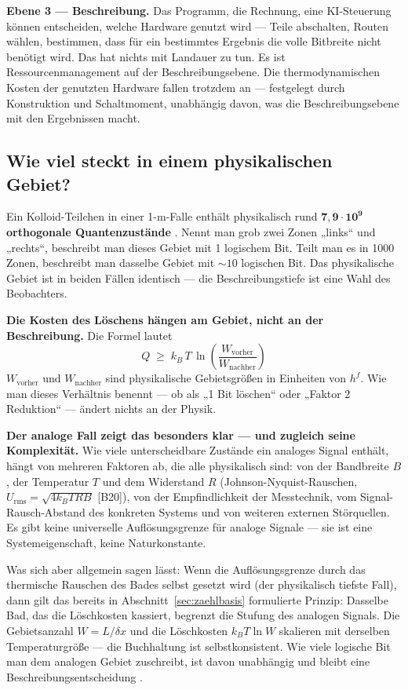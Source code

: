 \LB \textbf{Ebene 3 --- Beschreibung.} Das Programm, die Rechnung, eine
KI-Steuerung können entscheiden, welche Hardware genutzt wird --- Teile
abschalten, Routen wählen, bestimmen, dass für ein bestimmtes Ergebnis die volle
Bitbreite nicht benötigt wird. Das hat nichts mit Landauer zu tun. Es ist
Ressourcenmanagement auf der Beschreibungsebene. Die thermodynamischen Kosten der
genutzten Hardware fallen trotzdem an --- festgelegt durch Konstruktion und
Schaltmoment, unabhängig davon, was die Beschreibungsebene mit den Ergebnissen
macht.

\subsection{Wie viel steckt in einem physikalischen Gebiet?}

\LK Ein Kolloid-Teilchen in einer 1-\textmu m-Falle enthält physikalisch rund
$\mathbf{7{,}9\cdot10^{9}}$ \textbf{orthogonale Quantenzustände}
. Nennt man grob zwei Zonen „links“ und „rechts“, beschreibt man
dieses Gebiet mit 1 logischem Bit. Teilt man es in 1000 Zonen, beschreibt man
dasselbe Gebiet mit ${\sim}10$ logischen Bit. Das physikalische Gebiet ist in
beiden Fällen identisch --- die Beschreibungstiefe ist eine Wahl des Beobachters.

\LB \textbf{Die Kosten des Löschens hängen am Gebiet, nicht an der Beschreibung.}
Die Formel lautet
\[
  \boxed{\;Q \;\ge\; k_B\,T\,\ln\!\left(\frac{W_{\text{vorher}}}{W_{\text{nachher}}}\right)\;}
\]
$W_{\text{vorher}}$ und $W_{\text{nachher}}$ sind physikalische Gebietsgrößen in
Einheiten von $h^f$. Wie man dieses Verhältnis benennt --- ob als „1 Bit löschen“
oder „Faktor 2 Reduktion“ --- ändert nichts an der Physik.

\LK \textbf{Der analoge Fall zeigt das besonders klar --- und zugleich seine
Komplexität.} Wie viele unterscheidbare Zustände ein analoges Signal enthält,
hängt von mehreren Faktoren ab, die alle physikalisch sind: von der Bandbreite
$B$, der Temperatur $T$ und dem Widerstand $R$ (Johnson-Nyquist-Rauschen,
$U_{\text{rms}} = \sqrt{4 k_B T R B}$ [B20]), von der Empfindlichkeit der
Messtechnik, vom Signal-Rausch-Abstand des konkreten Systems und von weiteren
externen Störquellen. Es gibt keine universelle Auflösungsgrenze für analoge
Signale --- sie ist eine Systemeigenschaft, keine Naturkonstante.

Was sich aber allgemein sagen lässt: Wenn die Auflösungsgrenze durch das
thermische Rauschen des Bades selbst gesetzt wird (der physikalisch tiefste Fall),
dann gilt das bereits in Abschnitt~\ref{sec:zaehlbasis} formulierte Prinzip:
Dasselbe Bad, das die Löschkosten kassiert, begrenzt die Stufung des analogen
Signals. Die Gebietsanzahl $W = L/\delta x$ und die Löschkosten $k_B T \ln W$
skalieren mit derselben Temperaturgröße --- die Buchhaltung ist selbstkonsistent.
Wie viele logische Bit man dem analogen Gebiet zuschreibt, ist davon unabhängig
und bleibt eine Beschreibungsentscheidung .

